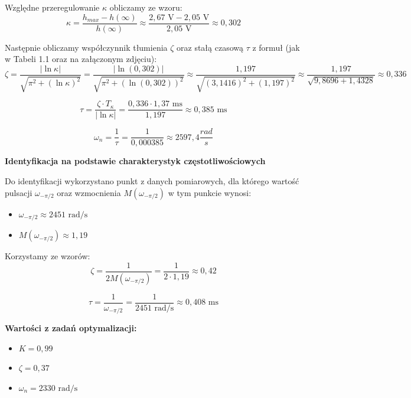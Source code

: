 \documentclass[12pt,a4paper]{article}
\begin{document}
	Względne przeregulowanie \(\kappa\) obliczamy ze wzoru:
	\begin{equation}
		\kappa = \frac{h_{max} - h(\infty)}{h(\infty)}
		\approx \frac{2,67 \text{ V} - 2,05 \text{ V}}{2,05 \text{ V}}
		\approx 0,302
	\end{equation}
	
	Następnie obliczamy współczynnik tłumienia \(\zeta\) oraz stałą czasową \(\tau\) z formuł (jak w Tabeli 1.1 oraz na załączonym zdjęciu):
	\begin{equation}
		\zeta = \frac{|\ln \kappa|}{\sqrt{\pi^2 + (\ln \kappa)^2}}
		= \frac{|\ln (0,302)|}{\sqrt{\pi^2 + (\ln (0,302))^2}}
		\approx \frac{1,197}{\sqrt{(3,1416)^2 + (1,197)^2}}
		\approx \frac{1,197}{\sqrt{9,8696 + 1,4328}}
		\approx 0,336
	\end{equation}
	
	\begin{equation}
		\tau = \frac{\zeta \cdot T_{\kappa}}{|\ln \kappa|}
		= \frac{0,336 \cdot 1,37 \text{ ms}}{1,197}
		\approx 0,385 \text{ ms}
	\end{equation}
	
	\begin{equation}
		\omega_n = \frac{1}{\tau} = \frac{1}{0,000385} \approx 2 597,4 \frac{rad}{s}
	\end{equation}
	
	\textbf{ Identyfikacja na podstawie charakterystyk częstotliwościowych}
	
	Do identyfikacji wykorzystano punkt z danych pomiarowych, dla którego wartość pulsacji $\omega_{-\pi/2}$ oraz wzmocnienia $M(\omega_{-\pi/2})$ w tym punkcie wynosi:
	\begin{itemize}
		\item $\omega_{-\pi/2} \approx 2451 \text{ rad/s}$
		\item $M(\omega_{-\pi/2}) \approx 1,19$
	\end{itemize}
	
	Korzystamy ze wzorów:
	\begin{equation}
		\zeta = \frac{1}{2 M(\omega_{-\pi/2})}
		= \frac{1}{2 \cdot 1,19}
		\approx 0,42
	\end{equation}
	
	\begin{equation}
		\tau = \frac{1}{\omega_{-\pi/2}}
		= \frac{1}{2451 \text{ rad/s}}
		\approx 0,408 \text{ ms}
	\end{equation}
	
	\textbf{Wartości z zadań optymalizacji:}
	\begin{itemize}
		\item $K = 0,99$
		\item $\zeta = 0,37$
		\item $\omega_n = 2330 \text{ rad/s}$
	\end{itemize}
	
\end{document}
